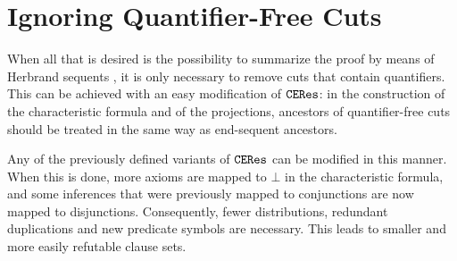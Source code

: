 \section{Ignoring Quantifier-Free Cuts}
\label{sec:CutEliminationByResolution:CEResIgnoringAtomicCuts}

When all that is desired is the possibility to 
summarize the proof by means of Herbrand sequents 
\cite{Paleo2007Herbrand-Sequent-Extraction,Paleo2008Herbrand-Sequent-Extraction,HetzlLeitschWellerPaleo2008Herbrand-Sequent-Extraction}, 
it is only necessary to remove cuts that contain quantifiers. 
This can be achieved with an easy modification of $\texttt{CERes}$: 
in the construction of the characteristic formula and of the projections, 
ancestors of quantifier-free cuts should be treated in the same way 
as end-sequent ancestors.

Any of the previously defined variants of $\texttt{CERes}$ can be modified in this
manner. When this is done, more axioms are mapped to $\bot$ in the
characteristic formula, and some inferences that were previously mapped to
conjunctions are now mapped to disjunctions. Consequently, fewer
distributions, redundant duplications and new predicate symbols are necessary.
This leads to smaller and more easily refutable clause sets.
